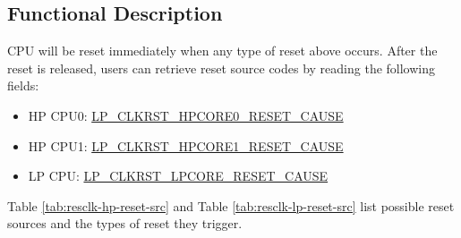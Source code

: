 \documentclass[main\_\_EN.tex]{subfiles}
\begin{document}
\subsection{Functional Description}
CPU will be reset immediately when any type of reset above occurs. After the reset is released, users can retrieve reset source codes by reading the following fields:
\begin{itemize}
    \item HP CPU0: \hyperref[fielddesc:LPCLKRSTHPCORE0RESETCAUSE]{LP\_CLKRST\_HPCORE0\_RESET\_CAUSE}
    \item HP CPU1: \hyperref[fielddesc:LPCLKRSTHPCORE0RESETCAUSE]{LP\_CLKRST\_HPCORE1\_RESET\_CAUSE}
    \item LP CPU: \hyperref[fielddesc:LPCLKRSTLPCORERESETCAUSE]{LP\_CLKRST\_LPCORE\_RESET\_CAUSE}
\end{itemize}

Table \ref{tab:resclk-hp-reset-src} and Table \ref{tab:resclk-lp-reset-src} list possible reset sources and the types of reset they trigger.
\end{document}

